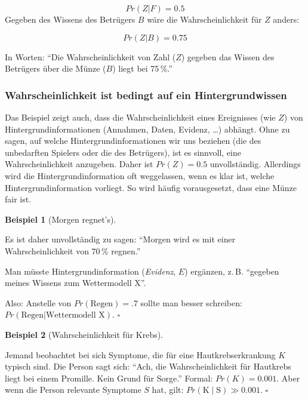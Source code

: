 \documentclass[
  ngerman,
  letterpaper,
  twoside,
  open=any]{scrbook}
\theoremstyle{definition}
\newtheorem{example}{Beispiel}[chapter]
\theoremstyle{plain}
\theoremstyle{definition}
\theoremstyle{definition}
\theoremstyle{definition}
\newtheorem{example}{Beispiel}[chapter]
\theoremstyle{definition}
\theoremstyle{remark}
\begin{document}
\[Pr(Z|F) = 0.5\] Gegeben des Wissens des Betrügers \(B\) wäre die
Wahrscheinlichkeit für \(Z\) anders:

\[Pr(Z|B) = 0.75\]

In Worten: \enquote{Die Wahrscheinlichkeit von Zahl (\(Z\)) gegeben das
Wissen des Betrügers über die Münze (\(B\)) liegt bei 75\,\%.}

\subsubsection{Wahrscheinlichkeit ist bedingt auf ein
Hintergrundwissen}\label{wahrscheinlichkeit-ist-bedingt-auf-ein-hintergrundwissen}

Das Beispiel zeigt auch, dass die Wahrscheinlichkeit eines Ereignisses
(wie \(Z\)) von Hintergrundinformationen (Annahmen, Daten, Evidenz,
\ldots) abhängt. Ohne zu sagen, auf welche Hintergrundinformationen wir
uns beziehen (die des unbedarften Spielers oder die des Betrügers), ist
es sinnvoll, eine Wahrscheinlichkeit anzugeben. Daher ist
\(Pr(Z) = 0.5\) unvollständig. Allerdings wird die
Hintergrundinformation oft weggelassen, wenn es klar ist, welche
Hintergrundinformation vorliegt. So wird häufig vorausgesetzt, dass eine
Münze fair ist.

\begin{example}[Morgen
regnet's]\protect\hypertarget{exm-bedingt}{}\label{exm-bedingt}

Es ist daher unvollständig zu sagen: \enquote{Morgen wird es mit einer
Wahrscheinlichkeit von 70\,\% regnen.}

Man müsste Hintergrundinformation (\emph{Evidenz}, \(E\)) ergänzen,
z.\,B. \enquote{gegeben meines Wissens zum Wettermodell X}.

Also: Anstelle von \(Pr(\text{Regen}) = .7\) sollte man besser
schreiben: \(Pr(\text{Regen|Wettermodell X})\). \(\square\)

\end{example}

\begin{example}[Wahrscheinlichkeit für
Krebs]\protect\hypertarget{exm-bedingt2}{}\label{exm-bedingt2}

Jemand beobachtet bei sich Symptome, die für eine Hautkrebserkrankung
\(K\) typisch sind. Die Person sagt sich: \enquote{Ach, die
Wahrscheinlichkeit für Hautkrebs liegt bei einem Promille. Kein Grund
für Sorge.} Formal: \(Pr(K) = 0.001\). Aber wenn die Person relevante
Symptome \(S\) hat, gilt: \(Pr(\text{K} \mid \text{S}) \gg 0.001\).
\(\square\)

\end{example}
\end{document}
